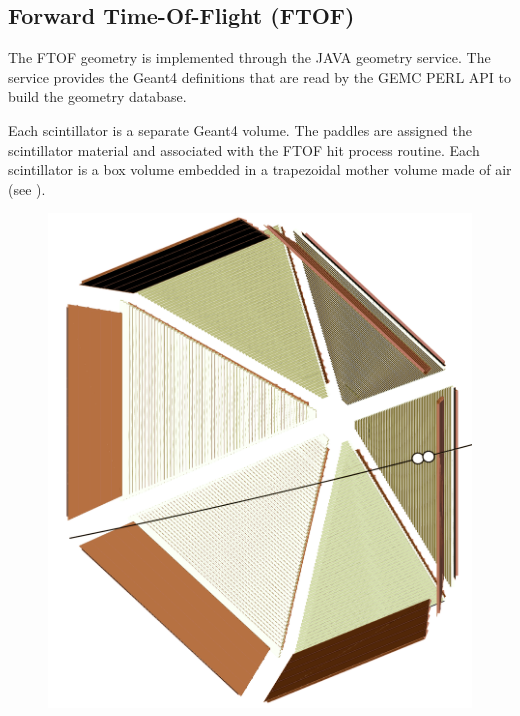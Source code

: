 \subsection{Forward Time-Of-Flight (FTOF)}

The FTOF geometry is implemented through the JAVA geometry service.
The service provides the Geant4 definitions that are read by the GEMC PERL API to build the geometry database.

Each scintillator is a separate Geant4 volume. The paddles are assigned the scintillator material and
associated with the FTOF hit process routine.
Each scintillator is a box volume embedded in a trapezoidal mother volume made of air (see ).

\begin{figure}
	\centering
	\includegraphics[width=0.99\columnwidth,keepaspectratio]{img/ftofGeometry.png}

\end{figure}
